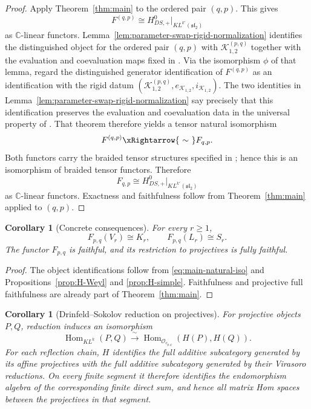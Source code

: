 \documentclass[12pt,leqno]{amsart}
\numberwithin{equation}{section}
\newtheorem{cor}[thm]{Corollary}
\newcommand{\Hom}{\operatorname{Hom}}
\newcommand{\KL}{KL}
\newcommand{\Oc}{\mathcal O}
\def\C{\mathbb{C}}
\begin{document}
\begin{proof}
Apply Theorem~\ref{thm:main} to the ordered pair $(q,p)$.  This gives
\[
 F^{(q,p)}\cong
 H^0_{DS,+}\big|_{\KL^{k'}(\mathfrak{sl}_2)}
\]
as $\C$-linear functors.  Lemma~\ref{lem:parameter-swap-rigid-normalization} identifies the
distinguished object for the ordered pair $(q,p)$ with
$\mathcal K^{(p,q)}_{1,2}$ together with the evaluation and coevaluation
maps fixed in \cite[Theorem~7.15]{McRaeYang}.  Via the isomorphism $\phi$
of that lemma, regard the distinguished generator identification of
$F^{(q,p)}$ as an identification with the rigid datum
$(\mathcal K^{(p,q)}_{1,2},e_{\mathcal K_{1,2}},i_{\mathcal K_{1,2}})$.
The two identities in Lemma~\ref{lem:parameter-swap-rigid-normalization}
say precisely that this identification preserves the evaluation and
coevaluation data in the universal property of
\cite[Theorem~6.8]{McRaeYang}.  That theorem therefore yields a tensor
natural isomorphism
\[
 F^{(q,p)}\xRightarrow{\ \sim\ }F_{q,p}.
\]
Both functors carry the braided tensor structures specified in
\cite[Theorem~7.15]{McRaeYang}; hence this is an isomorphism of braided
tensor functors.  Therefore
\[
 F_{q,p}\cong
 H^0_{DS,+}\big|_{\KL^{k'}(\mathfrak{sl}_2)}
\]
as $\C$-linear functors.  Exactness and faithfulness follow from
Theorem~\ref{thm:main} applied to $(q,p)$.
\end{proof}

\begin{cor}[Concrete consequences]\label{cor:main-consequences}
For every $r\ge1$,
\[
 F_{p,q}(V_r)\cong K_r,\qquad
 F_{p,q}(L_r)\cong S_r.
\]
The functor $F_{p,q}$ is faithful, and its restriction to projectives is
fully faithful.
\end{cor}

\begin{proof}
The object identifications follow from
\eqref{eq:main-natural-iso} and Propositions~\ref{prop:H-Weyl} and
\ref{prop:H-simple}.  Faithfulness and projective full faithfulness are
already part of Theorem~\ref{thm:main}.
\end{proof}

\begin{cor}[Drinfeld--Sokolov reduction on projectives]
\label{cor:DS-projective-fully-faithful}
For projective objects $P,Q$, reduction induces an isomorphism
\[
 \Hom_{\KL^k}(P,Q)\xrightarrow{\ \sim\ }
 \Hom_{\Oc_{c_{p,q}}}(H(P),H(Q)).
\]
For each reflection chain, $H$ identifies the full additive subcategory
generated by its affine projectives with the full additive subcategory
generated by their Virasoro reductions.  On every finite segment it therefore identifies the endomorphism algebra
of the corresponding finite direct sum, and hence all matrix Hom spaces
between the projectives in that segment.
\end{cor}
\end{document}
